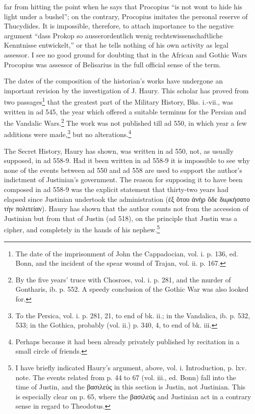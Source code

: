 far from hitting the point when he says that Procopius \texthebrew{“}is not wont to hide his light under a bushel\texthebrew{}”; on the contrary, Procopius imitates the personal reserve of Thucydides. It is impossible, therefore, to attach importance to the negative argument \texthebrew{“}dass Prokop so ausserordentlich wenig rechtswissenschaftliche Kenntnisse entwickelt,\texthebrew{}” or that he tells nothing of his own activity as legal assessor. I see no good ground for doubting that in the African and Gothic Wars Procopius was assessor of Belisarius in the full official sense of the term.

The dates of the composition of the historian\texthebrew{}’s works have undergone an important revision by the investigation of J. Haury. This scholar has proved from two passages\footnote{The date of the imprisonment of John the Cappadocian, vol. i. p. 136, ed. Bonn, and the incident of the spear wound of Trajan, vol. ii. p. 167.} that the greatest part of the Military History, Bks. i.-vii., was written in ad 545, the year which offered a suitable terminus for the Persian and the Vandalic Wars.\footnote{By the five years\texthebrew{}’ truce with Chosroes, vol. i. p. 281, and the murder of Gontharis, ib. p. 552. A speedy conclusion of the Gothic War was also looked for.} The work was not published till ad 550, in which year a few additions were made,\footnote{To the Persica, vol. i. p. 281, 21, to end of bk. ii.; in the Vandalica, ib. p. 532, 533; in the Gothica, probably (vol. ii.) p. 340, 4, to end of bk. iii.} but no alterations.\footnote{Perhaps because it had been already privately published by recitation in a small circle of friends.}

The Secret History, Haury has shown, was written in ad 550, not, as usually supposed, in ad 558-9. Had it been written in ad 558-9 it is impossible to see why none of the events between ad 550 and ad 558 are used to support the author\texthebrew{}’s indictment of Justinian\texthebrew{}’s government. The reason for supposing it to have been composed in ad 558-9 was the explicit statement that thirty-two years had elapsed since Justinian undertook the administration (\textgreek{\texthebrew{ἐ}ξ \texthebrew{ὅ}του \texthebrew{ἀ}ν\texthebrew{ὴ}ρ \texthebrew{ὅ}δε δι\texthebrew{ῳ}κήσατο τ\texthebrew{ὴ}ν πολιτείαν}). Haury has shown that the author counts not from the accession of Justinian but from that of Justin (ad 518), on the principle that Justin was a cipher, and completely in the hands of his nephew.\footnote{I have briefly indicated Haury\texthebrew{}’s argument, above, vol. i. Introduction, p. lxv. note. The events related from p. 44 to 67 (vol. iii., ed. Bonn) fall into the time of Justin, and the \textgreek{βασιλεύς} in this section is Justin, not Justinian. This is especially clear on p. 65, where the \textgreek{βασιλεύς} and Justinian act in a contrary sense in regard to Theodotus.}

